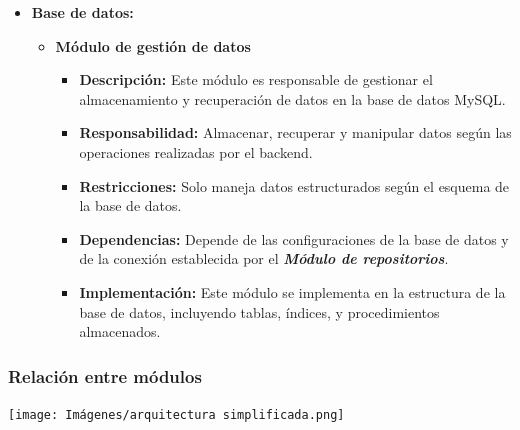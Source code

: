 \documentclass{article} %
\begin{document}
\begin{itemize}
        \item \textbf{Base de datos:}
        \begin{itemize}
            \item \textbf{Módulo de gestión de datos}
            \begin{itemize}
                \item \textbf{Descripción:} Este módulo es responsable de gestionar el almacenamiento y recuperación de datos en la base de datos MySQL.
                \item \textbf{Responsabilidad:} Almacenar, recuperar y manipular datos según las operaciones realizadas por el backend.
                \item \textbf{Restricciones:} Solo maneja datos estructurados según el esquema de la base de datos.
                \item \textbf{Dependencias:} Depende de las configuraciones de la base de datos y de la conexión establecida por el \textbf{\emph{Módulo de repositorios}}.
                \item \textbf{Implementación:} Este módulo se implementa en la estructura de la base de datos, incluyendo tablas, índices, y procedimientos almacenados.
            \end{itemize}
        \end{itemize}
    \end{itemize}
    \subsubsection{Relación entre módulos}
    \texttt{[image: Imágenes/arquitectura simplificada.png]}
\end{document}
